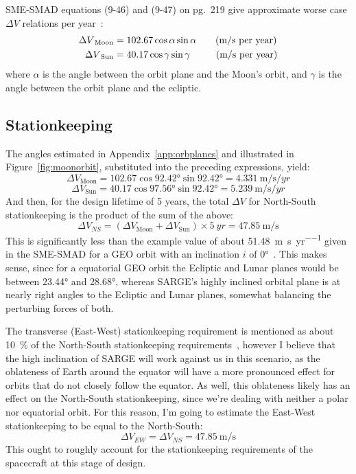 \documentclass[9pt]{article}
\begin{document}
SME-SMAD equations (9-46) and (9-47) on pg.~219 give approximate worse case $\Delta V$ relations per year~\cite{sme}:
\begin{align}
  {\Delta V}_\text{Moon} &= 102.67\cos\alpha\sin\alpha\hspace{2em}\text{(m/s per year)}\\
  {\Delta V}_\text{Sun} &= 40.17\cos\gamma\sin\gamma\hspace{2.7em}\text{(m/s per year)}
\end{align}
where $\alpha$ is the angle between the orbit plane and the Moon's orbit, and $\gamma$ is the angle between the orbit plane and the ecliptic.

\subsection{Stationkeeping}\label{app:stnkeep}
The angles estimated in Appendix~\ref{app:orbplanes} and illustrated in Figure~\ref{fig:moonorbit}, substituted into the preceding expressions, yield:
\begin{equation}
  {\Delta V}_\text{Moon} = 102.67\cos{\ang{92.42}}\sin{\ang{92.42}} = \qty{4.331}{\meter\per\second\per yr}
\end{equation}
\begin{equation}
  {\Delta V}_\text{Sun} = 40.17\cos{\ang{97.56}}\sin{\ang{92.42}} = \qty{5.239}{\meter\per\second\per yr}  
\end{equation}
And then, for the design lifetime of 5 years, the total $\Delta V$ for North-South stationkeeping is the product of the sum of the above:
\begin{equation}
  {\Delta V}_{NS} = ({\Delta V}_\text{Moon} + {\Delta V}_\text{Sun}) \times \qty{5}{yr} = \qty{47.85}{\meter\per\second}
\end{equation}
This is significantly less than the example value of about \qty{51.48}{\meter\per\second\per yr} given in the SME-SMAD for a GEO orbit with an inclination $i$ of \ang{0}~\cite{sme}.
This makes sense, since for a equatorial GEO orbit the Ecliptic and Lunar planes would be between \ang{23.44} and \ang{28.68}, whereas SARGE's highly inclined orbital plane is at nearly right angles to the Ecliptic and Lunar planes, somewhat balancing the perturbing forces of both.

The transverse (East-West) stationkeeping requirement is mentioned as about \qty{10}{\percent} of the North-South stationkeeping requirements~\cite{sme}, however I believe that the high inclination of SARGE will work against us in this scenario, as the oblateness of Earth around the equator will have a more pronounced effect for orbits that do not closely follow the equator.
As well, this oblateness likely has an effect on the North-South stationkeeping, since we're dealing with neither a polar nor equatorial orbit.
For this reason, I'm going to estimate the East-West stationkeeping to be equal to the North-South:
\begin{equation}
  {\Delta V}_{EW} = {\Delta V}_{NS} = \qty{47.85}{\meter\per\second}%
\end{equation}
This ought to roughly account for the stationkeeping requirements of the spacecraft at this stage of design. 
\end{document}
